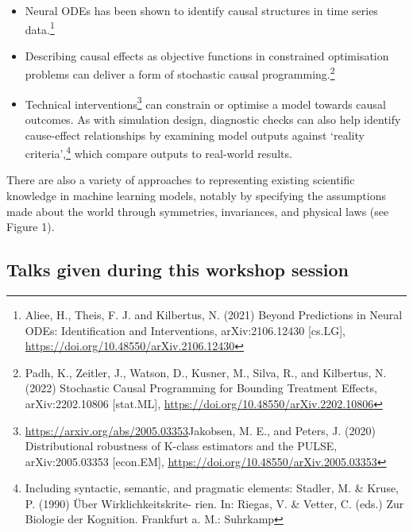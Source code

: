 \begin{itemize}
\item
  Neural ODEs has been shown to identify causal structures in time
  series data.\footnote{Aliee, H., Theis, F. J. and Kilbertus, N. (2021)
    Beyond Predictions in Neural ODEs: Identification and Interventions,
    arXiv:2106.12430 {[}cs.LG{]},
    \url{https://doi.org/10.48550/arXiv.2106.12430}}
\item
  Describing causal effects as objective functions in constrained
  optimisation problems can deliver a form of stochastic causal
  programming.\footnote{Padh, K., Zeitler, J., Watson, D., Kusner, M.,
    Silva, R., and Kilbertus, N. (2022) Stochastic Causal Programming
    for Bounding Treatment Effects, arXiv:2202.10806 {[}stat.ML{]},
    \url{https://doi.org/10.48550/arXiv.2202.10806}}
\item
  Technical interventions\footnote{\url{https://arxiv.org/abs/2005.03353}{Jakobsen,}
    M. E., and Peters, J. (2020) Distributional robustness of K-class
    estimators and the PULSE, arXiv:2005.03353 {[}econ.EM{]},
    \url{https://doi.org/10.48550/arXiv.2005.03353}}
  can constrain or optimise a model towards causal outcomes. As with
  simulation design, diagnostic checks can also help identify
  cause-effect relationships by examining model outputs against `reality
  criteria',\footnote{Including syntactic, semantic, and pragmatic
    elements: Stadler, M. \& Kruse, P. (1990) Über Wirklichkeitskrite-
    rien. In: Riegas, V. \& Vetter, C. (eds.) Zur Biologie der
    Kognition. Frankfurt a. M.: Suhrkamp} which compare outputs to
  real-world results.
\end{itemize}

There are also a variety of approaches to representing existing
scientific knowledge in machine learning models, notably by specifying
the assumptions made about the world through symmetries, invariances,
and physical laws (see Figure 1).

\subsection{Talks given during this workshop session}

\license

